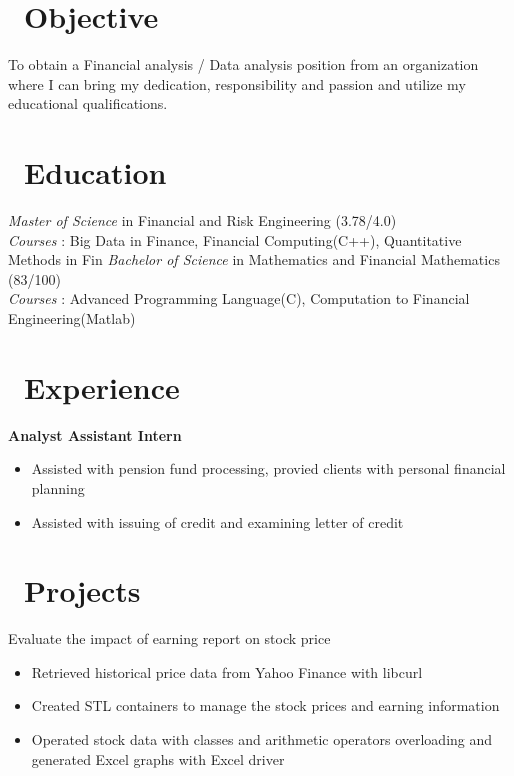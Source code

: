 \documentclass{resume}
\begin{document}



\section{\faUser\ Objective}
To obtain a Financial analysis / Data analysis position from an organization where I can bring my dedication, responsibility and passion and utilize my educational qualifications.
 
\section{\faGraduationCap\ Education}
\textit{Master of Science} in Financial and Risk Engineering (3.78/4.0) \\
\textit{Courses} : Big Data in Finance, Financial Computing(C++), Quantitative Methods in Fin
\textit{Bachelor of Science} in Mathematics and Financial Mathematics (83/100) \\
\textit{Courses} : Advanced Programming Language(C), Computation to Financial Engineering(Matlab)

\section{\faUsers\ Experience}
\textbf{Analyst Assistant Intern}
\begin{itemize}
  \item Assisted with pension fund processing, provied clients with personal financial planning
  \item Assisted with issuing of credit and examining letter of credit
\end{itemize}

\section{\faCogs\ Projects}
Evaluate the impact of earning report on stock price
\begin{itemize}
  \item Retrieved historical price data from Yahoo Finance with libcurl
  \item Created STL containers to manage the stock prices and earning information
  \item Operated stock data with classes and arithmetic operators overloading and generated Excel graphs with Excel driver
\end{itemize}
\end{document}
